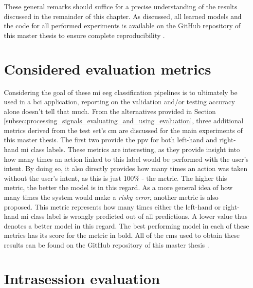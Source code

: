 These general remarks should suffice for a precise understanding of the results discussed in the remainder of this chapter.
As discussed, all learned models and the code for all performed experiments is available on the GitHub repository of this master thesis to ensure complete reproducibility \citep{github_project}.

\section{Considered evaluation metrics}
\label{sec:evaluation_eval_metrics}

Considering the goal of these \gls{mi} \gls{eeg} classification pipelines is to ultimately be used in a \gls{bci} application, reporting on the validation and/or testing accuracy alone doesn't tell that much.
From the alternatives provided in Section \ref{subsec:processing_signals_evaluating_and_using_evaluation}, three additional metrics derived from the test set's \gls{cm} are discussed for the main experiments of this master thesis.
The first two provide the \gls{ppv} for both left-hand and right-hand \gls{mi} class labels.
These metrics are interesting, as they provide insight into how many times an action linked to this label would be performed with the user's intent.
By doing so, it also directly provides how many times an action was taken without the user's intent, as this is just 100\% - the metric.
The higher this metric, the better the model is in this regard.
As a more general idea of how many times the system would make a \textit{risky error}, another metric is also proposed.
This metric represents how many times either the left-hand or right-hand \gls{mi} class label is wrongly predicted out of all predictions.
A lower value thus denotes a better model in this regard.
The best performing model in each of these metrics has its score for the metric in bold.
All of the \glspl{cm} used to obtain these results can be found on the GitHub repository of this master thesis \citep{github_project}.


\section{Intrasession evaluation}
\label{sec:evaluation_intrasession}


